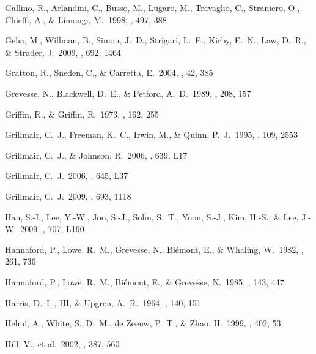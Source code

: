 \documentclass{emulateapj}
\begin{document}
\begin{thebibliography}{}
 Gallino, R., Arlandini, 
C., Busso, M., Lugaro, M., Travaglio, C., Straniero, O., Chieffi, A., 
\& Limongi, M.\ 1998, \apj, 497, 388 

 Geha, M., Willman, B., 
Simon, J.~D., Strigari, L.~E., Kirby, E.~N., Law, D.~R., 
\& Strader, J.\ 2009, \apj, 692, 1464 

 Gratton, R., Sneden, C., \& 
Carretta, E.\ 2004, \araa, 42, 385 

 Grevesse, N., Blackwell, D.~E., 
\& Petford, A.~D.\ 1989, \aap, 208, 157 

 Griffin, R., \& Griffin, R.\ 
1973, \mnras, 162, 255 

 Grillmair, C.~J., 
Freeman, K.~C., Irwin, M., \& Quinn, P.~J.\ 1995, \aj, 109, 2553 

 Grillmair, C.~J., 
\& Johnson, R.\ 2006, \apjl, 639, L17   %

 Grillmair, C.~J.\ 2006, 
\apjl, 645, L37 %

 Grillmair, C.~J.\ 2009, 
\apj, 693, 1118 

 Han, S.-I., Lee, Y.-W., 
Joo, S.-J., Sohn, S.~T., Yoon, S.-J., Kim, H.-S., 
\& Lee, J.-W.\ 2009, \apjl, 707, L190 

 Hannaford, P., Lowe, 
R.~M., Grevesse, N., Bi{\'e}mont, E., \& Whaling, W.\ 1982, \apj, 261, 736 

 Hannaford, P., Lowe, R.~M., 
Bi{\'e}mont, E., \& Grevesse, N.\ 1985, \aap, 143, 447 

 Harris, D.~L., III, \& 
Upgren, A.~R.\ 1964, \apj, 140, 151 



 Helmi, A., White, 
S.~D.~M., de Zeeuw, P.~T., \& Zhao, H.\ 1999, \nat, 402, 53 

 Hill, V., et al.\ 2002, \aap, 387, 560 


\end{thebibliography}
\end{document}

